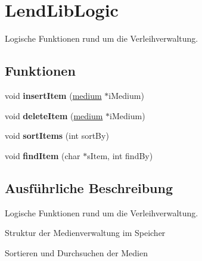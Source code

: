 \hypertarget{group___lend_lib_logic}{}\section{Lend\+Lib\+Logic}
\label{group___lend_lib_logic}


Logische Funktionen rund um die Verleihverwaltung.  


\subsection*{Funktionen}
\begin{DoxyCompactItemize}
\item 
void {\bfseries insert\+Item} (\hyperlink{structmedium}{medium} $\ast$i\+Medium)\hypertarget{group___lend_lib_logic_ga827a4b32c28a0e0f0c74b1fb8a21424f}{}\label{group___lend_lib_logic_ga827a4b32c28a0e0f0c74b1fb8a21424f}

\item 
void {\bfseries delete\+Item} (\hyperlink{structmedium}{medium} $\ast$i\+Medium)\hypertarget{group___lend_lib_logic_ga6c38063279d10df28fea3e28f6003b33}{}\label{group___lend_lib_logic_ga6c38063279d10df28fea3e28f6003b33}

\item 
void {\bfseries sort\+Items} (int sort\+By)\hypertarget{group___lend_lib_logic_ga6937d5ed6a8fdd7443c6c59873b36774}{}\label{group___lend_lib_logic_ga6937d5ed6a8fdd7443c6c59873b36774}

\item 
void {\bfseries find\+Item} (char $\ast$s\+Item, int find\+By)\hypertarget{group___lend_lib_logic_ga135825705d9c2d331afd7bc663f967ac}{}\label{group___lend_lib_logic_ga135825705d9c2d331afd7bc663f967ac}

\end{DoxyCompactItemize}


\subsection{Ausführliche Beschreibung}
Logische Funktionen rund um die Verleihverwaltung. 


\begin{DoxyItemize}
\item Struktur der Medienverwaltung im Speicher
\item Sortieren und Durchsuchen der Medien 
\end{DoxyItemize}